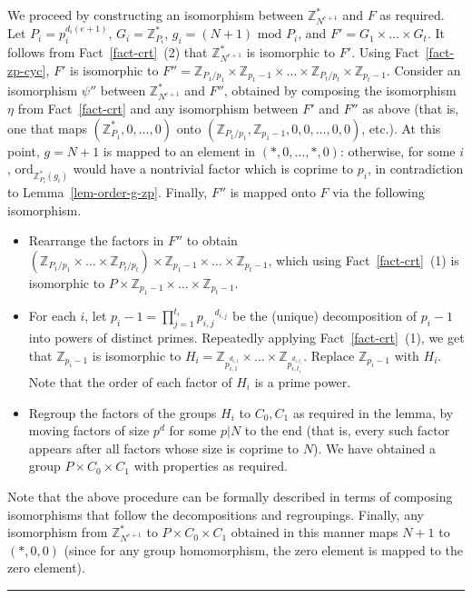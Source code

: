 \documentclass[11pt]{article}
\newenvironment{proof}{\noindent {\bf Proof:} \hspace{.677em}}%
                     {\qed}
\newcommand{\qed}{\hspace*{\fill}\rule{0.6em}{0.6em}}
\newcommand{\Z}{\mathbb{Z}}
\newcommand{\U}[1]{\mathbb{Z}_{#1}^*}
\newcommand{\opbrange}[3][,]{#2#1\ldots#1#3}
\newcommand{\order}{{\mathrm{ord}}}
\renewcommand{\mod}{{\,\,\mathrm{mod}\,\,}}
\begin{document}
\begin{proof}
We proceed by constructing an isomorphism between $\U{N^{e+1}}$ and
$F$ as required. Let $P_i=p^{d_i(e+1)}_i$, $G_i=\U{P_i}$,
$g_i=(N+1)\mod P_i$, and $F'=\opbrange[\times]{G_1}{G_t}$. It
follows from Fact~\ref{fact-crt}~(2) that $\U{N^{e+1}}$ is
isomorphic to $F'$. Using Fact~\ref{fact-zp-cyc}, $F'$ is
isomorphic to $F''=\opbrange[\times]{\Z_{P_1/p_1}\times
\Z_{p_1-1}}{\Z_{P_t/p_t}\times{\Z_{p_t-1}}}$. Consider an
isomorphism $\psi''$ between $\U{N^{e+1}}$ and $F''$, obtained by
composing the isomorphism $\eta$ from Fact~\ref{fact-crt} and any
isomorphism between $F'$ and $F''$ as above (that is, one that maps
$(\U{P_1},\opbrange{0}{0})$ onto
$(\Z_{P_1/p_1},\Z_{p_1-1},\opbrange{0,0}{0,0})$, etc.). At this
point, $g=N+1$ is mapped to an element in $(\opbrange{*,0}{*,0})$:
otherwise, for some $i$, $\order_{\U{P_i}(g_i)}$ would have a
nontrivial factor which is coprime to $p_i$, in contradiction to
Lemma~\ref{lem-order-g-zp}. Finally, $F''$ is mapped onto $F$ via
the following isomorphism.
\begin{itemize}
\item Rearrange the factors in $F''$ to obtain
$(\opbrange[\times]{\Z_{P_1/p_1}}{\Z_{P_t/p_t}})
\times\opbrange[\times]{\Z_{p_1-1}}{\Z_{p_t-1}}$, which using
Fact~\ref{fact-crt}~(1) is isomorphic to
$P\times\opbrange[\times]{\Z_{p_1-1}}{\Z_{p_t-1}}$.
\item  For each $i$, let $p_i-1=\prod^{t_i}_{j=1}{p_{i,j}}^{d_{i,j}}$ be the
(unique) decomposition of $p_i-1$ into powers of distinct primes.
Repeatedly applying Fact~\ref{fact-crt}~(1), we get that
$\Z_{p_i-1}$ is isomorphic to
$H_i=\opbrange[\times]{\Z_{p^{d_{i,1}}_{i,1}}}{\Z_{p^{d_{i,t_i}}_{i,t_i}}}$.
Replace $\Z_{p_i-1}$ with $H_i$. Note that the order of each factor
of $H_i$ is a prime power.
\item Regroup the factors of the groups $H_i$ to $C_0,C_1$
as required in the lemma, by moving factors of size $p^d$ for some
$p|N$ to the end (that is, every such factor appears after all
factors whose size is coprime to $N$). We have obtained a group
$P\times C_0\times C_1$ with properties as required.
\end{itemize}
Note that the above procedure can be formally described in terms of
composing isomorphisms that follow the decompositions and
regroupings. Finally, any isomorphism from $\U{N^{e+1}}$ to
$P\times C_0\times C_1$ obtained in this manner maps $N+1$ to
$(*,0,0)$ (since for any group homomorphism, the zero element is
mapped to the zero element).
\end{proof}
\end{document}
